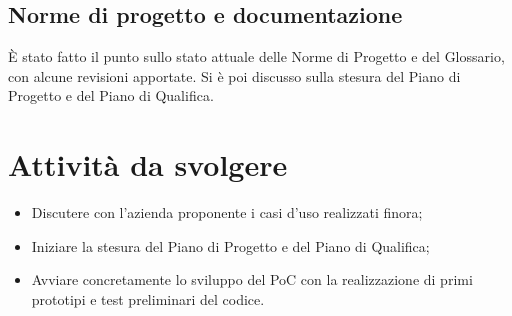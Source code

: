 \documentclass[10pt]{article}
\begin{document}
    \subsection{Norme di progetto e documentazione}
    È stato fatto il punto sullo stato attuale delle Norme di Progetto e del Glossario, con alcune revisioni apportate. Si è poi discusso sulla stesura del Piano di Progetto e del Piano di Qualifica.
    
    \section{Attività da svolgere}
    \begin{itemize}
        \item Discutere con l'azienda proponente i casi d'uso realizzati finora;
        \item Iniziare la stesura del Piano di Progetto e del Piano di Qualifica;
        \item Avviare concretamente lo sviluppo del PoC con la realizzazione di primi prototipi e test preliminari del codice.
    \end{itemize}



     
\end{document}
